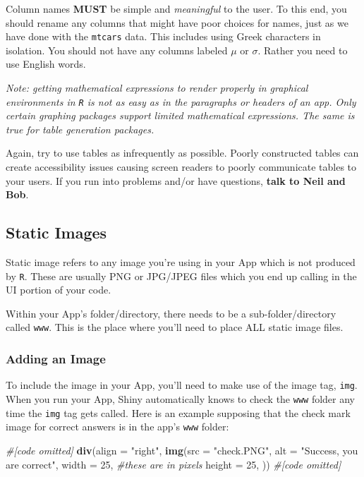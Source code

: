 \documentclass[
]{book}
\newenvironment{Shaded}{\begin{snugshade}}{\end{snugshade}}
\newcommand{\CommentTok}[1]{\textcolor[rgb]{0.56,0.35,0.01}{\textit{#1}}}
\newcommand{\DataTypeTok}[1]{\textcolor[rgb]{0.13,0.29,0.53}{#1}}
\newcommand{\DecValTok}[1]{\textcolor[rgb]{0.00,0.00,0.81}{#1}}
\newcommand{\KeywordTok}[1]{\textcolor[rgb]{0.13,0.29,0.53}{\textbf{#1}}}
\newcommand{\NormalTok}[1]{#1}
\newcommand{\StringTok}[1]{\textcolor[rgb]{0.31,0.60,0.02}{#1}}
\begin{document}
Column names \textbf{MUST} be simple and \emph{meaningful} to the user. To this end, you should rename any columns that might have poor choices for names, just as we have done with the \texttt{mtcars} data. This includes using Greek characters in isolation. You should not have any columns labeled \(\mu\) or \(\sigma\). Rather you need to use English words.

\emph{Note: getting mathematical expressions to render properly in graphical environments in \texttt{R} is not as easy as in the paragraphs or headers of an app. Only certain graphing packages support limited mathematical expressions. The same is true for table generation packages.}

Again, try to use tables as infrequently as possible. Poorly constructed tables can create accessibility issues causing screen readers to poorly communicate tables to your users. If you run into problems and/or have questions, \textbf{talk to Neil and Bob}.

\hypertarget{static-images}{%
\subsection{Static Images}\label{static-images}}

Static image refers to any image you're using in your App which is not produced by \texttt{R}. These are usually PNG or JPG/JPEG files which you end up calling in the UI portion of your code.

Within your App's folder/directory, there needs to be a sub-folder/directory called \texttt{www}. This is the place where you'll need to place ALL static image files.

\hypertarget{adding-an-image}{%
\subsubsection{Adding an Image}\label{adding-an-image}}

To include the image in your App, you'll need to make use of the image tag, \texttt{img}. When you run your App, Shiny automatically knows to check the \texttt{www} folder any time the \texttt{img} tag gets called. Here is an example supposing that the check mark image for correct answers is in the app's \texttt{www} folder:

\begin{Shaded}
\begin{Highlighting}[]
\CommentTok{#[code omitted]}
\KeywordTok{div}\NormalTok{(}\DataTypeTok{align =} \StringTok{"right"}\NormalTok{,}
    \KeywordTok{img}\NormalTok{(}\DataTypeTok{src =} \StringTok{"check.PNG"}\NormalTok{,}
        \DataTypeTok{alt =} \StringTok{"Success, you are correct"}\NormalTok{,}
        \DataTypeTok{width =} \DecValTok{25}\NormalTok{, }\CommentTok{#these are in pixels}
        \DataTypeTok{height =} \DecValTok{25}\NormalTok{,}
\NormalTok{        ))}
\CommentTok{#[code omitted]}
\end{Highlighting}
\end{Shaded}
\end{document}
